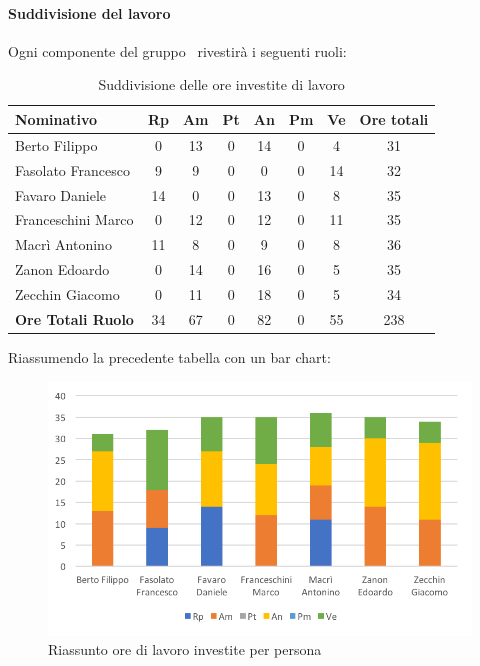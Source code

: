 \documentclass[../PianoDiProgetto_v3.0.0.tex]{subfiles}
\begin{document}
			\paragraph{Suddivisione del lavoro}
			Ogni componente del gruppo \kpanic\ rivestirà i seguenti ruoli:
			\begin{table}[h]
				\begin{tabularx}{\textwidth}{l * {6}{C} c}
				\toprule
				\textbf{Nominativo} & \textbf{Rp} & \textbf{Am} & \textbf{Pt} & \textbf{An} & \textbf{Pm} & \textbf{Ve} & \textbf{Ore totali} \\
				\midrule
				Berto Filippo &	0 & 13 & 0 & 14 & 0 & 4 &  31 \\
				Fasolato Francesco & 9 & 9 & 0 & 0 & 0 & 14 & 32 \\
				Favaro Daniele & 14 & 0 & 0 & 13 & 0 & 8 & 35 \\
				Franceschini Marco & 0 & 12 & 0 & 12 & 0 & 11 & 35 \\
				Macrì Antonino & 11 & 8 & 0 & 9 & 0 & 8 & 36 \\
				Zanon Edoardo &	0 & 14 & 0 & 16 & 0 & 5 & 35 \\
				Zecchin Giacomo & 0 & 11 & 0 & 18 & 0 & 5 & 34 \\
				\midrule			
				\textbf{Ore Totali Ruolo} & 34 & 67 & 0 & 82 & 0 & 55 & 238 \\
				\bottomrule
				\end{tabularx}
				\caption{Suddivisione delle ore investite di lavoro}		
			\end{table}

			Riassumendo la precedente tabella con un bar chart:	
			\begin{figure}[!h]
				\centering
				\includegraphics[width=\textwidth]{Preventivo//Immagini/investito_oreRuoloPersona.png}
				\caption{Riassunto ore di lavoro investite per persona}
			\end{figure}	
			
\end{document}
